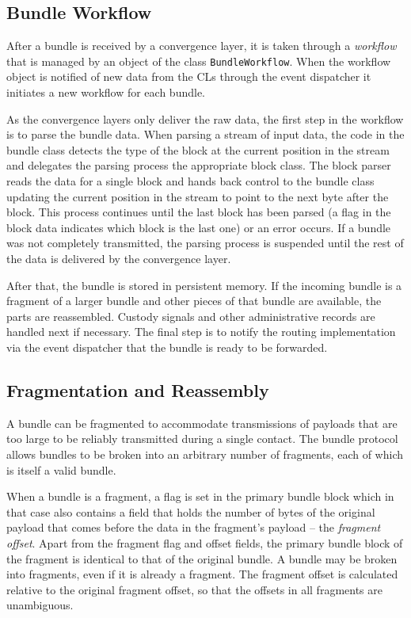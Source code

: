 \documentclass[a4paper]{article}
\begin{document}
\subsection{Bundle Workflow}\label{sec.workflow}

After a bundle is received by a convergence layer, it is taken through a {\em
workflow} that is managed by an object of the class {\tt BundleWorkflow}. When
the workflow object is notified of new data from the CLs through the event
dispatcher it initiates a new workflow for each bundle.

As the convergence layers only deliver the raw data, the first step in the
workflow is to parse the bundle data.  When parsing a stream of input
data, the code in the bundle class detects the type of the block at the current
position in the stream and delegates the parsing process the appropriate block
class. The block parser reads the data for a single block and hands back control
to the bundle class updating the current position in the stream to point to the
next byte after the block. This process continues until the last block has been
parsed (a flag in the block data indicates which block is the last one) or an
error occurs. If a bundle was not completely transmitted, the parsing process is
suspended until the rest of the data is delivered by the convergence layer.

After that, the bundle is stored in persistent memory. If the incoming
bundle is a fragment of a larger bundle and other pieces of that bundle are
available, the parts are reassembled. Custody signals and other
administrative records are handled next if necessary. The final step is to
notify the routing implementation via the event dispatcher that the bundle is
ready to be forwarded.

\subsection{Fragmentation and Reassembly}\label{sec.frag}

A bundle can be fragmented to accommodate transmissions of payloads that are too
large to be reliably transmitted during a single contact. The bundle protocol
allows bundles to be broken into an arbitrary number of fragments, each of which
is itself a valid bundle. 

When a bundle is a fragment, a flag is set in the primary bundle block which in
that case also contains a field that holds the number of bytes of the original
payload that comes before the data in the fragment's payload -- the {\em
fragment offset}. Apart from the fragment flag and offset fields, the primary
bundle block of the fragment is identical to that of the original bundle. A
bundle may be broken into fragments, even if it is already a fragment.  The
fragment offset is calculated relative to the original fragment offset, so that
the offsets in all fragments are unambiguous.
\end{document}
